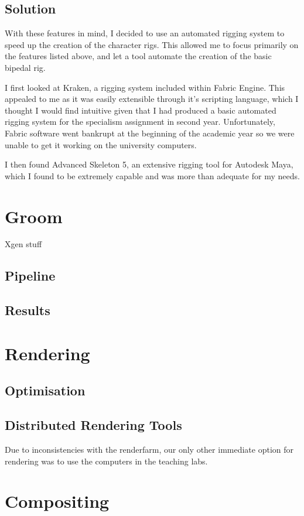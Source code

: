 \documentclass[11pt]{article}
\begin{document}
\subsection{Solution}

With these features in mind, I decided to use an automated rigging system to speed up the creation of the character rigs. This allowed me to focus primarily on the features listed above, and let a tool automate the creation of the basic bipedal rig.

I first looked at Kraken\cite{kraken}, a rigging system included within Fabric Engine. This appealed to me as it was easily extensible through it's scripting language, which I thought I would find intuitive given that I had produced a basic automated rigging system for the specialism assignment in second year. Unfortunately, Fabric software went bankrupt at the beginning of the academic year so we were unable to get it working on the university computers.

I then found Advanced Skeleton 5\cite{advancedSkeleton}, an extensive rigging tool for Autodesk Maya, which I found to be extremely capable and was more than adequate for my needs.

\section{Groom}

Xgen stuff

\subsection{Pipeline}

\subsection{Results}

\section{Rendering}

\subsection{Optimisation}

\subsection{Distributed Rendering Tools}

Due to inconsistencies with the renderfarm, our only other immediate option for rendering was to use the computers in the teaching labs.

\cite{pssh}
\cite{martin_2008}

\section{Compositing}



\end{document}
